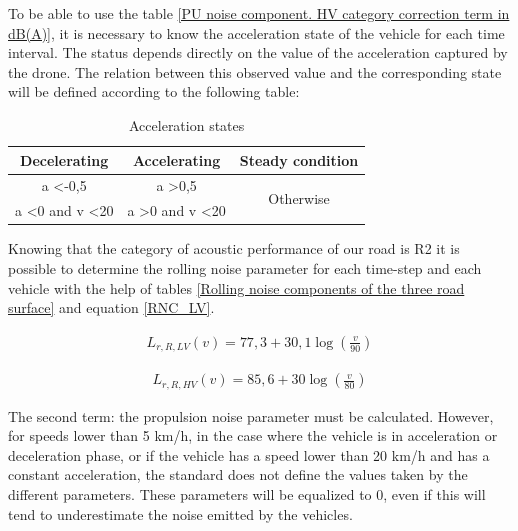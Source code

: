 \documentclass{article}
\begin{document}
{\color{red} \noindent To be able to use the table \ref{PU noise component. HV category correction term in dB(A)}, it is necessary to know the acceleration state of the vehicle for each time interval.
The status depends directly on the value of the acceleration captured by the drone. The relation between this observed value and the corresponding state will be defined according to the following table:

\begin{table}[H]
\centering
\caption{Acceleration states}
\label{Acceleration states}
\begin{tabular}{|c|c|c|}
\hline
Decelerating                     & Accelerating                        & Steady condition           \\ \hline
a \textless -0,5                 & a \textgreater 0,5                  & \multirow{2}{*}{Otherwise} \\
a \textless 0 and v \textless 20 & a \textgreater 0 and v \textless 20 &                            \\ \hline
\end{tabular}
\end{table}

\noindent Knowing that the category of acoustic performance of our road is R2 it is possible to determine the rolling noise parameter for each time-step and each vehicle with the help of tables \ref{Rolling noise components of the three road surface} and equation \ref{RNC_LV}.

\begin{equation}
    \label{RNC_LV2}
    \begin{aligned}
        L_{r,R,LV}(v) = 77,3+30,1\log(\frac{v}{90})
    \end{aligned}
\end{equation}


\begin{equation}
    \label{RNC_HV2}
    \begin{aligned}
        L_{r,R,HV}(v) = 85,6+30\log(\frac{v}{80})
    \end{aligned}
\end{equation}

\noindent The second term: the propulsion noise parameter must be calculated. However, for speeds lower than 5 km/h, in the case where the vehicle is in acceleration or deceleration phase, or if the vehicle has a speed lower than 20 km/h and has a constant acceleration, the standard does not define the values taken by the different parameters. These parameters will be equalized to 0, even if this will tend to underestimate the noise emitted by the vehicles.

}
\end{document}
